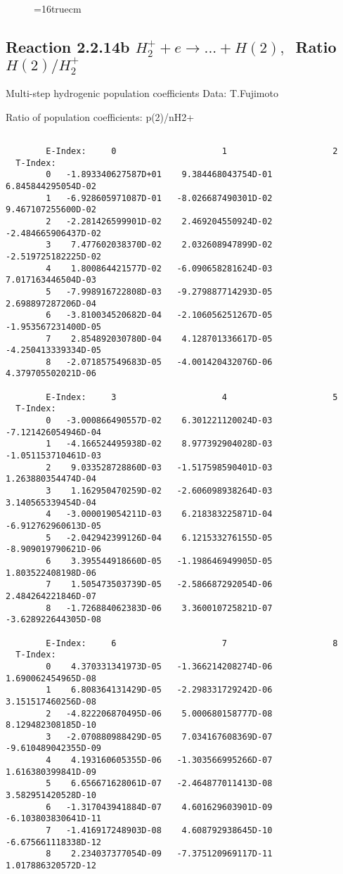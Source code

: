 \documentclass[12pt]{article}
\begin{document}
\begin{figure} \label{2.2.14a}
\epsfxsize=16truecm
\end{figure}
\newpage

\subsection{
Reaction 2.2.14b $ H_2^+ + e \rightarrow ...+ H(2) , \   $
Ratio $H(2)/H_2^+  $
}

 Multi-step hydrogenic population coefficients
 Data: T.Fujimoto

 Ratio of population coefficients: p(2)/nH2+

\begin{small}\begin{verbatim}

        E-Index:     0                     1                     2
  T-Index:
        0   -1.893340627587D+01    9.384468043754D-01    6.845844295054D-02
        1   -6.928605971087D-01   -8.026687490301D-02    9.467107255600D-02
        2   -2.281426599901D-02    2.469204550924D-02   -2.484665906437D-02
        3    7.477602038370D-02    2.032608947899D-02   -2.519725182225D-02
        4    1.800864421577D-02   -6.090658281624D-03    7.017163446504D-03
        5   -7.998916722808D-03   -9.279887714293D-05    2.698897287206D-04
        6   -3.810034520682D-04   -2.106056251267D-05   -1.953567231400D-05
        7    2.854892030780D-04    4.128701336617D-05   -4.250413339334D-05
        8   -2.071857549683D-05   -4.001420432076D-06    4.379705502021D-06

        E-Index:     3                     4                     5
  T-Index:
        0   -3.000866490557D-02    6.301221120024D-03   -7.121426054946D-04
        1   -4.166524495938D-02    8.977392904028D-03   -1.051153710461D-03
        2    9.033528728860D-03   -1.517598590401D-03    1.263880354474D-04
        3    1.162950470259D-02   -2.606098938264D-03    3.140565339454D-04
        4   -3.000019054211D-03    6.218383225871D-04   -6.912762960613D-05
        5   -2.042942399126D-04    6.121533276155D-05   -8.909019790621D-06
        6    3.395544918660D-05   -1.198646949905D-05    1.803522408198D-06
        7    1.505473503739D-05   -2.586687292054D-06    2.484264221846D-07
        8   -1.726884062383D-06    3.360010725821D-07   -3.628922644305D-08

        E-Index:     6                     7                     8
  T-Index:
        0    4.370331341973D-05   -1.366214208274D-06    1.690062454965D-08
        1    6.808364131429D-05   -2.298331729242D-06    3.151517460256D-08
        2   -4.822206870495D-06    5.000680158777D-08    8.129482308185D-10
        3   -2.070880988429D-05    7.034167608369D-07   -9.610489042355D-09
        4    4.193160605355D-06   -1.303566995266D-07    1.616380399841D-09
        5    6.656671628061D-07   -2.464877011413D-08    3.582951420528D-10
        6   -1.317043941884D-07    4.601629603901D-09   -6.103803830641D-11
        7   -1.416917248903D-08    4.608792938645D-10   -6.675661118338D-12
        8    2.234037377054D-09   -7.375120969117D-11    1.017886320572D-12


\end{verbatim}
\end{small}
\end{document}
